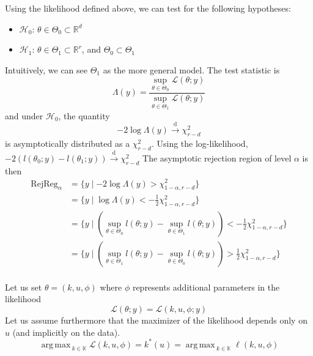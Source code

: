 \documentclass[a4paper,11pt]{article}
\newcommand{\Kspace}{\mathbb{K}}
\DeclareMathOperator*{\argmax}{arg\,max \,}
\theoremstyle{defi}
\numberwithin{thmCounter}{section}
\begin{document}
\label{sec:lik_test}
Using the likelihood defined above, we can test for the following hypotheses:
\begin{itemize}
\item $\mathcal{H}_0$: $\theta \in \Theta_0\subset \mathbb{R}^d$
\item $\mathcal{H}_1$: $\theta \in \Theta_1 \subset \mathbb{R}^r$, and $\Theta_0 \subset \Theta_1$
\end{itemize}
Intuitively, we can see $\Theta_1$ as the more general model.
The test statistic is
\begin{equation}
  \label{eq:def_lik_ratio}
  \Lambda(y) = \frac{\sup_{\theta \in \Theta_0} \mathcal{L}(\theta ; y)}{\sup_{\theta \in \Theta_1} \mathcal{L}(\theta ; y)}
\end{equation}
and under $\mathcal{H}_0$, the quantity 
\begin{equation}
  - 2 \log \Lambda(y) \xrightarrow[]{\mathrm{d}} \chi^2_{r-d}
\end{equation}
is asymptotically distributed as a $\chi^2_{r-d}$.
Using the log-likelihood, $-2(l(\theta_0;y) - l(\theta_1;y)) \xrightarrow{\mathrm{d}} \chi^2_{r-d}$
The asymptotic rejection region of level $\alpha$ is then
\begin{align}
  \mathrm{RejReg}_{\alpha} &= \{y \mid -2 \log \Lambda(y) > \chi^2_{1-\alpha, r-d} \} \\
                           &= \{y \mid \log \Lambda(y) < -\frac12 \chi^2_{1-\alpha, r-d} \} \\
                           &= \{ y \mid (\sup_{\theta\in\Theta_0} l(\theta;y) - \sup_{\theta\in\Theta_1} l(\theta;y)) < -\frac12 \chi^2_{1-\alpha, r-d} \} \\
                           &= \{ y \mid (\sup_{\theta\in\Theta_1} l(\theta;y) - \sup_{\theta\in\Theta_0} l(\theta;y)) > \frac12 \chi^2_{1-\alpha, r-d} \} \\
\end{align}




Let us set $\theta = (k,u,\phi)$ where $\phi$ represents additional parameters in the likelihood
\begin{equation}
  \mathcal{L}(\theta; y) = \mathcal{L}(k, u, \phi ; y)
\end{equation}
Let us assume furthermore that the maximizer of the likelihood depends only on $u$ (and implicitly on the data).
\begin{equation}
  \argmax_{k \in \Kspace} \mathcal{L}(k,u, \phi) = k^*(u) = \argmax_{k \in \Kspace} \ell(k,u, \phi)
\end{equation}
\end{document}
